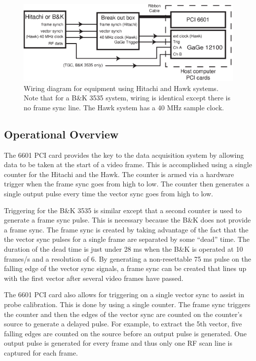 \documentclass[10pt]{article}
\begin{document}
\begin{figure}[htb]
\begin{center}
\includegraphics[width=4.2 in]{wiring.eps}
 \caption{Wiring diagram for equipment using Hitachi and Hawk systems. Note
 that for a B\&K 3535 system, wiring is identical except there is no frame
sync line. The Hawk system has a 40 MHz sample clock.}
 \label{fig:wiring}
\end{center}
\end{figure}

\subsection{Operational Overview}

The 6601 PCI card provides the key to the data acquisition system
by allowing data to be taken at the start of a video frame. This
is accomplished using a single counter for the Hitachi and the
Hawk. The counter is armed via a hardware trigger when the frame
sync goes from high to low. The counter then generates a single
output pulse every time the vector sync goes from high to low.

Triggering for the B\&K 3535 is similar except that a second
counter is used to generate a frame sync pulse. This is necessary
because the B\&K does not provide a frame sync. The frame sync is
created by taking advantage of the fact that the the vector sync
pulses for a single frame are separated by some ``dead'' time. The
duration of the dead time is just under 28 ms when the B\&K is
operated at 10 frames/s and a resolution of 6. By generating a
non-resettable 75 ms pulse on the falling edge of the vector sync
signals, a frame sync can be created that lines up with the first
vector after several video frames have passed.

The 6601 PCI card also allows for triggering on a single vector
sync to assist in probe calibration. This is done by using a
single counter. The frame sync triggers the counter and then the
edges of the vector sync are counted on the counter's source to
generate a delayed pulse. For example, to extract the 5th vector,
five falling edges are counted on the source before an output
pulse is generated. One output pulse is generated for every frame
and thus only one RF scan line is captured for each frame.
\end{document}
